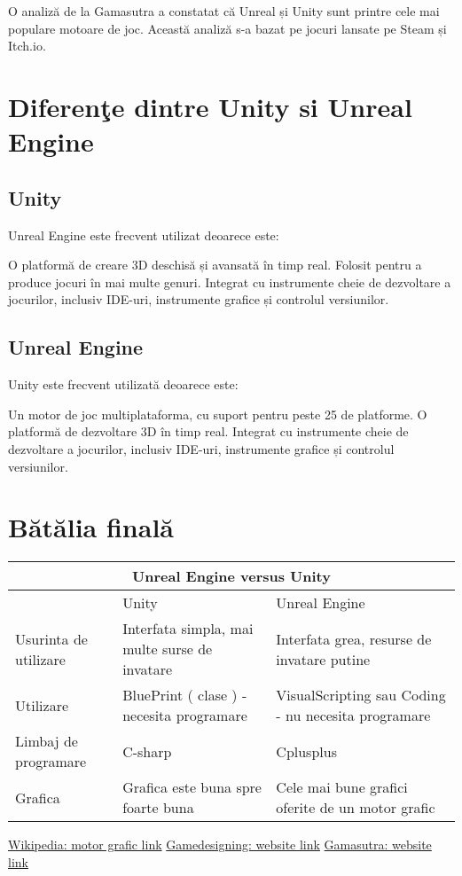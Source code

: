 \documentclass[12pt]{article}
\begin{document}
O analiză de la Gamasutra a constatat că Unreal și Unity sunt printre cele mai populare motoare de joc. Această analiză s-a bazat pe jocuri lansate pe Steam și Itch.io.

\newpage
\section{Diferen\c{t}e dintre Unity si Unreal Engine}
\subsection{Unity}

Unreal Engine este frecvent utilizat deoarece este:

O platformă de creare 3D deschisă și avansată în timp real.
Folosit pentru a produce jocuri în mai multe genuri.
Integrat cu instrumente cheie de dezvoltare a jocurilor, inclusiv IDE-uri, instrumente grafice și controlul versiunilor.
\subsection{Unreal Engine}
Unity este frecvent utilizată deoarece este:

Un motor de joc multiplataforma, cu suport pentru peste 25 de platforme.
O platformă de dezvoltare 3D în timp real.
Integrat cu instrumente cheie de dezvoltare a jocurilor, inclusiv IDE-uri, instrumente grafice și controlul versiunilor.

\newpage
\section{B\u{a}t\u{a}lia final\u{a}}
\begin{tabular}{ |p{3cm}|p{3cm}|p{3cm}|  }
\hline
\multicolumn{3}{|c|}{Unreal Engine versus Unity} \\
\hline
& Unity & Unreal Engine \\
\hline
Usurinta de utilizare & Interfata simpla, mai multe surse de invatare   & Interfata grea, resurse de invatare putine \\
Utilizare & BluePrint ( clase ) - necesita programare & VisualScripting sau Coding - nu necesita programare \\
Limbaj de programare  & C-sharp &  Cplusplus \\
Grafica & Grafica este buna spre foarte buna & Cele mai bune grafici oferite de un motor grafic \\
\hline
\end{tabular}

\newpage
\begin{thebibliography}{}
\href{https://ro.wikipedia.org/wiki/Motor_grafic}{Wikipedia: motor grafic link}
\href{https://www.gamedesigning.org/career/video-game-engines/}{Gamedesigning: website link}
\href{https://www.gamasutra.com/}{Gamasutra: website link}
\end{thebibliography}
\end{document}
